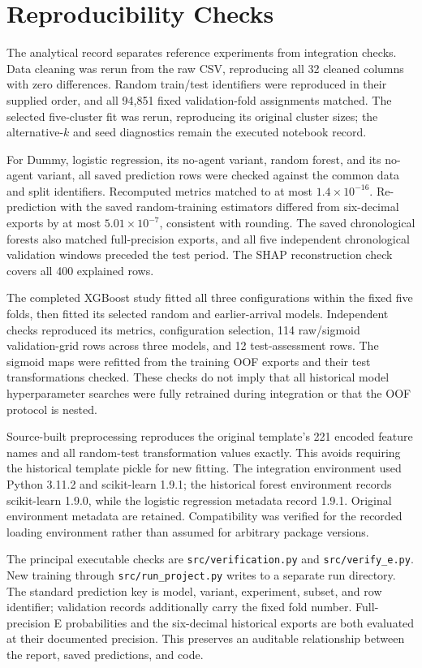 \section{Reproducibility Checks}
The analytical record separates reference experiments from integration checks. Data cleaning was rerun from the raw CSV, reproducing all 32 cleaned columns with zero differences. Random train/test identifiers were reproduced in their supplied order, and all 94,851 fixed validation-fold assignments matched. The selected five-cluster fit was rerun, reproducing its original cluster sizes; the alternative-\(k\) and seed diagnostics remain the executed notebook record.

For Dummy, logistic regression, its no-agent variant, random forest, and its no-agent variant, all saved prediction rows were checked against the common data and split identifiers. Recomputed metrics matched to at most \(1.4\times10^{-16}\). Re-prediction with the saved random-training estimators differed from six-decimal exports by at most \(5.01\times10^{-7}\), consistent with rounding. The saved chronological forests also matched full-precision exports, and all five independent chronological validation windows preceded the test period. The SHAP reconstruction check covers all 400 explained rows.

The completed XGBoost study fitted all three configurations within the fixed five folds, then fitted its selected random and earlier-arrival models. Independent checks reproduced its metrics, configuration selection, 114 raw/sigmoid validation-grid rows across three models, and 12 test-assessment rows. The sigmoid maps were refitted from the training OOF exports and their test transformations checked. These checks do not imply that all historical model hyperparameter searches were fully retrained during integration or that the OOF protocol is nested.

Source-built preprocessing reproduces the original template's 221 encoded feature names and all random-test transformation values exactly. This avoids requiring the historical template pickle for new fitting. The integration environment used Python 3.11.2 and scikit-learn 1.9.1; the historical forest environment records scikit-learn 1.9.0, while the logistic regression metadata record 1.9.1. Original environment metadata are retained. Compatibility was verified for the recorded loading environment rather than assumed for arbitrary package versions.

The principal executable checks are \texttt{src/verification.py} and \texttt{src/verify\_e.py}. New training through \texttt{src/run\_project.py} writes to a separate run directory. The standard prediction key is model, variant, experiment, subset, and row identifier; validation records additionally carry the fixed fold number. Full-precision E probabilities and the six-decimal historical exports are both evaluated at their documented precision. This preserves an auditable relationship between the report, saved predictions, and code.
